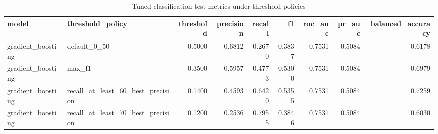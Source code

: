 \begin{table}
\caption{Tuned classification test metrics under threshold policies}
\label{tab:classification-tuned-metrics}
\begin{tabular}{llrrrrrrr}
\toprule
model & threshold\_policy & threshold & precision & recall & f1 & roc\_auc & pr\_auc & balanced\_accuracy \\
\midrule
gradient\_boosting & default\_0\_50 & 0.5000 & 0.6812 & 0.2670 & 0.3837 & 0.7531 & 0.5084 & 0.6178 \\
gradient\_boosting & max\_f1 & 0.3500 & 0.5957 & 0.4773 & 0.5300 & 0.7531 & 0.5084 & 0.6979 \\
gradient\_boosting & recall\_at\_least\_60\_best\_precision & 0.1400 & 0.4593 & 0.6420 & 0.5355 & 0.7531 & 0.5084 & 0.7259 \\
gradient\_boosting & recall\_at\_least\_70\_best\_precision & 0.1200 & 0.2536 & 0.7955 & 0.3846 & 0.7531 & 0.5084 & 0.6030 \\
\bottomrule
\end{tabular}
\end{table}
